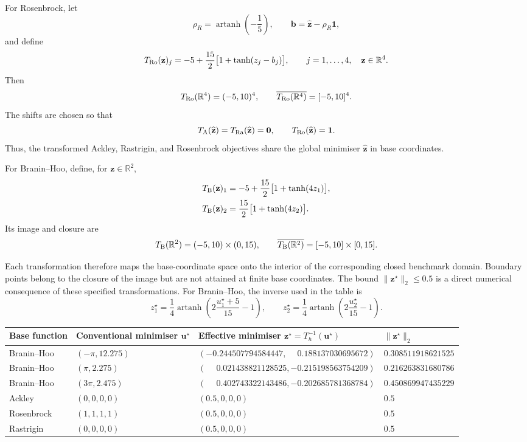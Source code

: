 \documentclass[pdflatex,sn-mathphys-num]{sn-jnl}%
\theoremstyle{thmstyleone}%
\theoremstyle{thmstyletwo}%
\theoremstyle{thmstylethree}%
\begin{document}
\begin{appendices}
For Rosenbrock, let
\[
  \rho_R
  =\operatorname{artanh}\!\left(-\frac15\right),
  \qquad
  \mathbf b
  =\widehat{\mathbf z}-\rho_R\mathbf 1,
\]
and define
\[
  T_{\rm Ro}(\mathbf z)_j
  =-5+\frac{15}{2}\bigl[1+\tanh(z_j-b_j)\bigr],
  \qquad j=1,\ldots,4,\quad \mathbf z\in\mathbb R^4.
\]
Then
\[
  T_{\rm Ro}(\mathbb R^4)=(-5,10)^4,
  \qquad
  \overline{T_{\rm Ro}(\mathbb R^4)}=[-5,10]^4.
\]
The shifts are chosen so that
\[
  T_{\rm A}(\widehat{\mathbf z})
  =T_{\rm Ra}(\widehat{\mathbf z})
  =\mathbf 0,
  \qquad
  T_{\rm Ro}(\widehat{\mathbf z})=\mathbf 1.
\]
Thus, the transformed Ackley, Rastrigin, and Rosenbrock objectives share the global minimiser $\widehat{\mathbf z}$ in base coordinates.

For Branin--Hoo, define, for $\mathbf z\in\mathbb R^2$,
\[
\begin{aligned}
  T_{\rm B}(\mathbf z)_1
  &=-5+\frac{15}{2}\bigl[1+\tanh(4z_1)\bigr],\\
  T_{\rm B}(\mathbf z)_2
  &=\frac{15}{2}\bigl[1+\tanh(4z_2)\bigr].
\end{aligned}
\]
Its image and closure are
\[
  T_{\rm B}(\mathbb R^2)=(-5,10)\times(0,15),
  \qquad
  \overline{T_{\rm B}(\mathbb R^2)}
  =[-5,10]\times[0,15].
\]

Each transformation therefore maps the base-coordinate space onto the interior of the corresponding closed benchmark domain. Boundary points belong to the closure of the image but are not attained at finite base coordinates. The bound $\lVert\mathbf z^\star\rVert_2\leq 0.5$ is a direct numerical consequence of these specified transformations. For Branin--Hoo, the inverse used in the table is
\[
 z_1^\star=\frac14\operatorname{artanh}\!\left(
   2\frac{u_1^\star+5}{15}-1\right),
 \qquad
 z_2^\star=\frac14\operatorname{artanh}\!\left(
   2\frac{u_2^\star}{15}-1\right).
\]

\begin{table}[h]
\centering
\tiny
\setlength{\tabcolsep}{3pt}
\renewcommand{\arraystretch}{1.1}

\begin{tabularx}{\linewidth}{@{}l l l l @{}}
\toprule
Base function & Conventional minimiser $\mathbf u^\star$
 & Effective minimiser $\mathbf z^\star=T_h^{-1}(\mathbf u^\star)$
 & $\lVert\mathbf z^\star\rVert_2$ \\
\midrule

Branin--Hoo
 & $(-\pi,12.275)$
 & $(-0.244507794584447,\phantom{-}0.188137030695672)$
 & $0.308511918621525$ \\
Branin--Hoo
 & $(\pi,2.275)$
 & $(\phantom{-}0.021438821128525,-0.215198563754209)$
 & $0.216263831680786$ \\
Branin--Hoo
 & $(3\pi,2.475)$
 & $(\phantom{-}0.402743322143486,-0.202685781368784)$
 & $0.450869947435229$ \\
Ackley
 & $(0,0,0,0)$
 & $(0.5,0,0,0)$
 & $0.5$ \\
Rosenbrock
 & $(1,1,1,1)$
 & $(0.5,0,0,0)$
 & $0.5$ \\
Rastrigin
 & $(0,0,0,0)$
 & $(0.5,0,0,0)$
 & $0.5$ \\


\end{tabularx}
\end{table}
\end{appendices}
\end{document}
